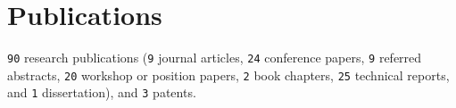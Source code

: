 \documentclass[11pt, letterpaper]{article}
\newcommand{\amper}{{\fontspec[Scale=.95]{Hoefler Text}\selectfont\itshape\&}}
\begin{document}
\section*{Publications}
\texttt{90} research publications
(\texttt{9} journal articles,
\texttt{24} conference papers, \texttt{9} referred abstracts,
\texttt{20} workshop or position papers, \texttt{2} book
chapters, \texttt{25} technical reports, and \texttt{1} dissertation),
and \texttt{3} patents.
\end{document}
